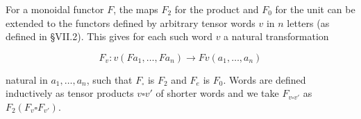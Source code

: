 For a monoidal functor $F$, the maps $F_2$ for the product and $F_0$ for the unit can be extended to the functors defined by arbitrary tensor words $v$ in $n$ letters (as defined in \S VII.2). This gives for each such word $v$ a natural transformation

$$F_v : v(F a_1, \ldots, F a_n) \to F v(a_1, \ldots, a_n)$$

natural in $a_1, \ldots, a_n$, such that $F_\square$ is $F_2$ and $F_e$ is $F_0$. Words are defined inductively as tensor products $v \square v'$ of shorter words and we take $F_{v \square v'}$ as $F_2(F_v \square F_{v'})$.
